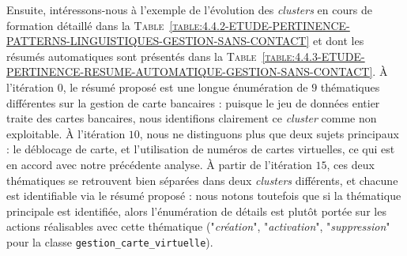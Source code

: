 			Ensuite, intéressons-nous à l'exemple de l'évolution des \textit{clusters} en cours de formation détaillé dans la \textsc{Table~\ref{table:4.4.2-ETUDE-PERTINENCE-PATTERNS-LINGUISTIQUES-GESTION-SANS-CONTACT}} et dont les résumés automatiques sont présentés dans la \textsc{Table~\ref{table:4.4.3-ETUDE-PERTINENCE-RESUME-AUTOMATIQUE-GESTION-SANS-CONTACT}}.
			À l'itération $0$, le résumé proposé est une longue énumération de $9$ thématiques différentes sur la gestion de carte bancaires : puisque le jeu de données entier traite des cartes bancaires, nous identifions clairement ce \textit{cluster} comme non exploitable.
			À l'itération $10$, nous ne distinguons plus que deux sujets principaux : le déblocage de carte, et l'utilisation de numéros de cartes virtuelles, ce qui est en accord avec notre précédente analyse.
			À partir de l'itération $15$, ces deux thématiques se retrouvent bien séparées dans deux \textit{clusters} différents, et chacune est identifiable via le résumé proposé : nous notons toutefois que si la thématique principale est identifiée, alors l'énumération de détails est plutôt portée sur les actions réalisables avec cette thématique ("\textit{création}", "\textit{activation}", "\textit{suppression}" pour la classe \texttt{gestion\_carte\_virtuelle}).
